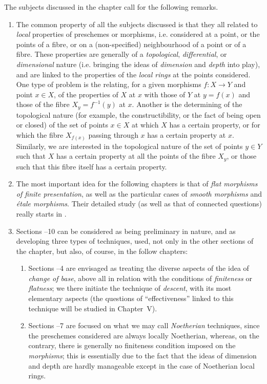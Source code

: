 \documentclass[openany,oneside]{amsbook}
\theoremstyle{ega-env-style}
\theoremstyle{ega-thm-env-style}
\theoremstyle{ega-defn-env-style}
\newcommand{\oldpage}[2][]{{\marginnote{\normalfont{\textbf{#1}~|~#2}}}\ignorespaces}
\begin{document}
\oldpage[IV-1]{223}
The subjects discussed in the chapter call for the following remarks.
\begin{enumerate}
  \item[(a)] The common property of all the subjects discussed is that they all related to \emph{local} properties of preschemes or morphisms, i.e. considered at a point, or the points of a fibre, or on a (non-specified) neighbourhood of a point or of a fibre.
    These properties are generally of a \emph{topological}, \emph{differential}, or \emph{dimensional} nature (i.e. bringing the ideas of \emph{dimension} and \emph{depth} into play), and are linked to the properties of the \emph{local rings} at the points considered.
    One type of problem is the relating, for a given morphisms $f:X\to Y$ and point $x\in X$, of the properties of $X$ at $x$ with those of $Y$ at $y=f(x)$ and those of the fibre $X_y=f^{-1}(y)$ at $x$.
    Another is the determining of the topological nature (for example, the constructibility, or the fact of being open or closed) of the set of points $x\in X$ at which $X$ has a certain property, or for which the fibre $X_{f(x)}$ passing through $x$ has a certain property at $x$.
    Similarly, we are interested in the topological nature of the set of points $y\in Y$ such that $X$ has a certain property at all the points of the fibre $X_y$, or those such that this fibre itself has a certain property.
  \item[(b)] The most important idea for the following chapters is that of \emph{flat morphisms of finite presentation}, as well as the particular cases of \emph{smooth morphisms} and \emph{\'etale morphisms}.
    Their detailed study (as well as that of connected questions) really starts in .
  \item[(c)] Sections \textsection{}--10 can be considered as being preliminary in nature, and as developing three types of techniques, used, not only in the other sections of the chapter, but also, of course, in the follow chapters:
    \begin{enumerate}
      \item[(c1)] Sections \textsection{}--4 are envisaged as treating the diverse aspects of the idea of \emph{change of base}, above all in relation with the conditions of \emph{finiteness} or \emph{flatness}; we there initiate the technique of \emph{descent}, with its most elementary aspects (the questions of ``effectiveness'' linked to this technique will be studied in Chapter~V).
      \item[(c2)] Sections \textsection{}--7 are focused on what we may call \emph{Noetherian} techniques, since the preschemes considered are always locally Noetherian, whereas, on the contrary, there is generally no finiteness condition imposed on the \emph{morphisms}; this is essentially due to the fact that the ideas of dimension and depth are hardly manageable except in the case of Noetherian local rings.

\end{enumerate}
\end{enumerate}
\end{document}
